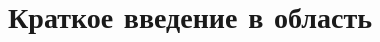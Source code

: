 \documentclass[14pt]{beamer}
\begin{document}

\section{Краткое  введение в область}
\end{document}
